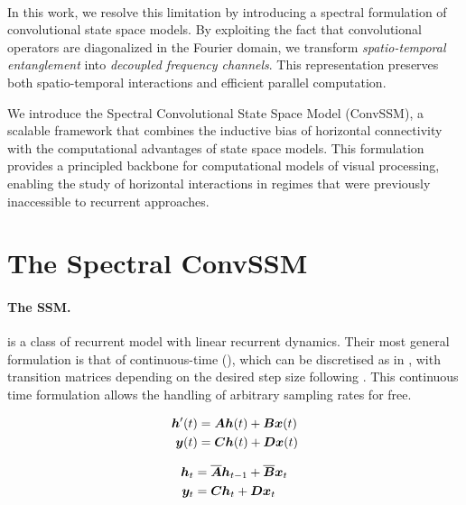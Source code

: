 \documentclass{article}
\begin{document}
\paragraph{}In this work, we resolve this limitation by introducing a spectral formulation of convolutional state space models. By exploiting the fact that convolutional operators are diagonalized in the Fourier domain, we transform \emph{spatio-temporal entanglement} into \emph{decoupled frequency channels}. This representation preserves both spatio-temporal interactions and efficient parallel computation.

We introduce the Spectral Convolutional State Space Model (ConvSSM), a scalable framework that combines the inductive bias of horizontal connectivity with the computational advantages of state space models. This formulation provides a principled backbone for computational models of visual processing, enabling the study of horizontal interactions in regimes that were previously inaccessible to recurrent approaches.

\section{The Spectral ConvSSM}

\paragraph{The SSM.} is a class of recurrent model with linear recurrent dynamics. Their most general formulation is that of continuous-time (), which can be discretised as in , with transition matrices depending on the desired step size following . This continuous time formulation allows the handling of arbitrary sampling rates for free.

\begin{minipage}[t]{.45\linewidth}
  \begin{subequations}
    \label{eq:ssm}
    \begin{align}
      \bm{h}'(t) &= \bm{A} \bm{h}(t) + \bm{B} \bm{x}(t) \\
      \bm{y}(t) &= \bm{C} \bm{h}(t) + \bm{D} \bm{x}(t)
    \end{align}
  \end{subequations}
\end{minipage}%
\begin{minipage}[t]{.45\linewidth}
  \begin{subequations}
    \label{eq:ssm:recurrence}
    \begin{align}
    \label{eq:ssm:recurrence:1}
      \bm{h}_{t} &= \overline{\bm{A}} \bm{h}_{t-1} + \overline{\bm{B}} \bm{x}_t \\
    \label{eq:ssm:recurrence:2}
      \bm{y}_t &= \bm{C} \bm{h}_t + \bm{D} \bm{x}_t
    \end{align}
  \end{subequations}
\end{minipage}%
\end{document}
